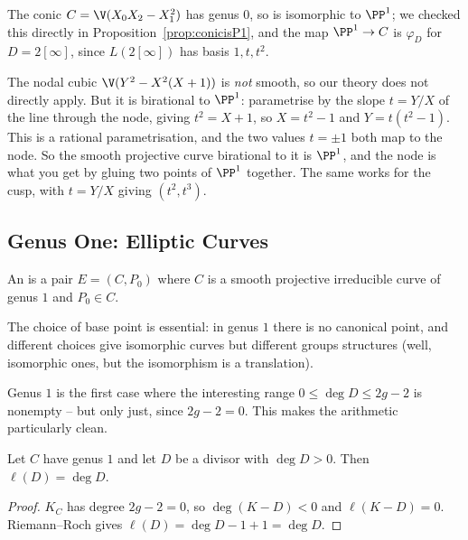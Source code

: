 \begin{example}
	The conic $C = \V(X_0X_2-X_1^2)$ has genus $0$, so is isomorphic to $\PP^1$; we checked this directly in Proposition~\ref{prop:conicisP1}, and the map $\PP^1\to C$ is $\varphi_D$ for $D = 2[\infty]$, since $L(2[\infty])$ has basis $1,t,t^2$.
\end{example}

\begin{example}
	The nodal cubic $\V(Y^2-X^2(X+1))$ is \emph{not} smooth, so our theory does not directly apply. But it is birational to $\PP^1$: parametrise by the slope $t = Y/X$ of the line through the node, giving $t^2 = X+1$, so $X = t^2-1$ and $Y = t(t^2-1)$. This is a rational parametrisation, and the two values $t = \pm1$ both map to the node. So the smooth projective curve birational to it is $\PP^1$, and the node is what you get by gluing two points of $\PP^1$ together. The same works for the cusp, with $t = Y/X$ giving $(t^2,t^3)$.
\end{example}

\subsection{Genus One: Elliptic Curves}

\begin{definition}
	An  is a pair $E = (C,P_0)$ where $C$ is a smooth projective irreducible curve of genus $1$ and $P_0 \in C$.
\end{definition}

The choice of base point is essential: in genus $1$ there is no canonical point, and different choices give isomorphic curves but different groups structures (well, isomorphic ones, but the isomorphism is a translation).

Genus $1$ is the first case where the interesting range $0\leq \deg D \leq 2g-2$ is nonempty -- but only just, since $2g-2 = 0$. This makes the arithmetic particularly clean.

\begin{corollary}\label{cor:g1RR}
	Let $C$ have genus $1$ and let $D$ be a divisor with $\deg D > 0$. Then $\ell(D) = \deg D$.
\end{corollary}

\begin{proof}
	$K_C$ has degree $2g-2 = 0$, so $\deg(K-D) < 0$ and $\ell(K-D) = 0$. Riemann--Roch gives $\ell(D) = \deg D - 1 + 1 = \deg D$.
\end{proof}

